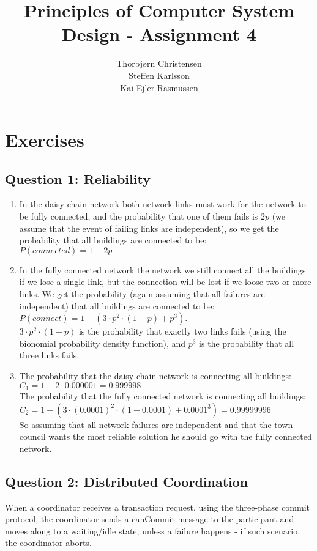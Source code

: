 \documentclass[10pt,a4paper]{article}
\author{Thorbjørn Christensen \\
Steffen Karlsson \\
Kai Ejler Rasmussen}
\title{Principles of Computer System Design - Assignment 4}
\begin{document}
\maketitle

\section*{Exercises}
\subsection*{Question 1: Reliability}
\begin{enumerate}
	\item In the daisy chain network both network links must work for the network to be fully connected, and the probability that one of them fails is $2p$ (we assume that the event of failing links are independent), so we get the probability that all buildings are connected to be: \\
  $P(connected) = 1 - 2p$
 	\item In the fully connected network the network we still connect all the buildings if we lose a single link, but the connection will be lost if we loose two or more links. We get the probability (again assuming that all failures are independent) that all buildings are connected to be: \\
  $P(connect) = 1 - (3 \cdot p^2 \cdot (1-p) + p^3)$. \\
  $3 \cdot p^2 \cdot (1-p)$ is the prohability that exactly two links fails (using the bionomial probability density function), and $p^3$ is the probability that all three links fails. 
  \item The probability that the daisy chain network is connecting all buildings: \\
  $C_1 = 1 - 2 \cdot 0.000001 = 0.999998$ \\
  The probability that the fully connected network is connecting all buildings: \\
  $C_2 = 1 - (3 \cdot (0.0001)^2 \cdot (1-0.0001) + 0.0001^3) = 0.99999996$ \\
  So assuming that all network failures are independent and that the town council wants the most reliable solution he should go with the fully connected network.
\end{enumerate}


\subsection*{Question 2: Distributed Coordination}
When a coordinator receives a transaction request, using the three-phase commit protocol, the coordinator sends a canCommit message to the participant and moves along to a waiting/idle state, unless a failure happens - if such scenario, the coordinator aborts. 
\newline
\end{document}
